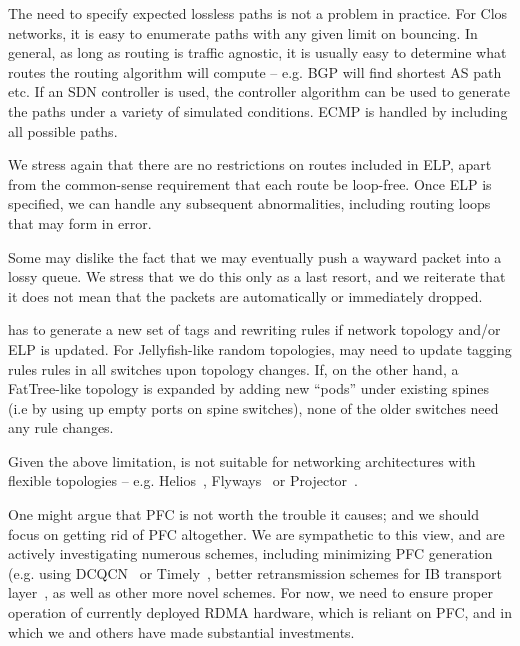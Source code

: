  The need to specify expected lossless paths is not a
problem in practice. For Clos networks, it is easy to enumerate paths with any
given limit on bouncing. In general, as long as routing is traffic agnostic, it
is usually easy to determine what routes the routing algorithm will compute --
e.g. BGP will find shortest AS path etc.  If an SDN controller is used, the
controller algorithm can be used to generate the paths under a variety of
simulated conditions. ECMP is handled by including all possible paths.

We stress again that there are no restrictions on routes included in ELP, apart
from the common-sense requirement that each route be loop-free. Once ELP is
specified, we can handle any subsequent abnormalities, including routing loops
that may form in error.

 Some may dislike the fact that we may eventually push
a wayward packet into a lossy queue. We stress that we do this only as a last
resort, and we reiterate that it does not mean that the packets are
automatically or immediately dropped.

 \sysname{} has to generate a new set of
tags and rewriting rules if network topology and/or ELP is updated. For
Jellyfish-like random topologies, \sysname{} may need to update tagging rules
rules in all switches upon topology changes.  If, on the other hand, a
FatTree-like topology is expanded by adding new ``pods'' under existing spines
(i.e by using up empty ports on spine switches), none of the older switches need
any rule changes.

 Given the above limitation, \sysname{} is not
suitable for networking architectures with flexible topologies -- e.g.
Helios~\cite{helios}, Flyways~\cite{flyways} or Projector~\cite{projector}.

 One might argue that PFC is not worth the trouble it
causes; and we should focus on getting rid of PFC altogether.
We are sympathetic to this view, and are
actively investigating numerous schemes, including minimizing PFC generation
(e.g.  using DCQCN~\cite{dcqcn} or Timely~\cite{timely}, better retransmission
schemes for IB transport layer~\cite{roce}, as well as other more novel schemes.
For now, we need \sysname{} to ensure proper operation of currently deployed RDMA
hardware, which is reliant on PFC, and in which we and others have made
substantial investments.

